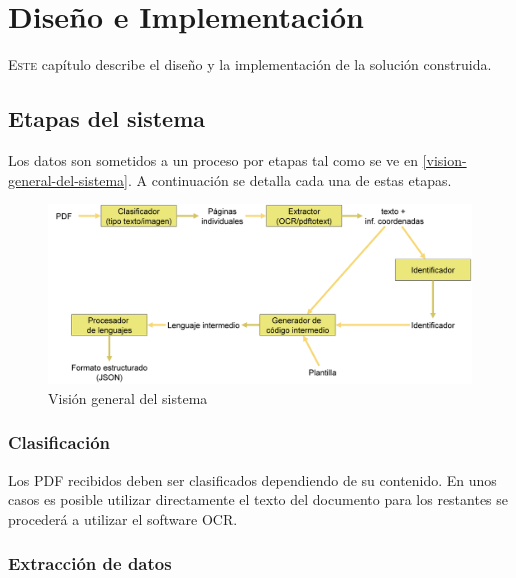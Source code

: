 
\chapter{Diseño e Implementación}
\label{chap:implemetación}

\lettrine{E}{ste} capítulo describe el diseño y la implementación de la solución construida. 

\section{Etapas del sistema}

Los datos son sometidos a un proceso por etapas tal como se ve en \ref{vision-general-del-sistema}. A continuación se detalla cada una de estas etapas.

\begin{figure}[hp!]
    \centering
    \includegraphics[width=1.0\textwidth]{imaxes/h-implementacion/vision-general-del-sistema}
    \caption{Visión general del sistema}
    \label{fig:vision-general-del-sistema}
\end{figure}

\subsection{Clasificación}

Los PDF recibidos deben ser clasificados dependiendo de su contenido. En unos casos es posible utilizar directamente el texto del documento para los restantes se procederá a utilizar el software OCR.



\subsection{Extracción de datos}

